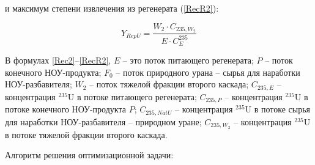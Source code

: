 и максимум степени извлечения из регенерата (\ref{RecR2}):

\begin{equation} \label{RecR2} 
    Y_{RepU} = \frac{W_2\cdot C_{235,W_2}}{E \cdot C_{E}^{235}}        
\end{equation} 

В формулах \ref{Rec2}--\ref{RecR2}, $E$ -- это поток питающего регенерата; $P$ -- поток конечного НОУ-продукта; $F_0$ -- поток природного урана -- сырья для наработки НОУ-разбавителя; $W_2$ -- поток тяжелой фракции второго каскада;
$C_{235,E}$ -- концентрация $^{235}$U в потоке питающего регенерата; $C_{235,P}$ -- концентрация $^{235}$U в потоке конечного НОУ-продукта $P$; $C_{235,NatU}$ -- концентрация $^{235}$U в потоке сырья для наработки НОУ-разбавителя -- природном уране; $C_{235,W_2}$ -- концентрация $^{235}$U в потоке тяжелой фракции второго каскада.

Алгоритм решения оптимизационной задачи:

